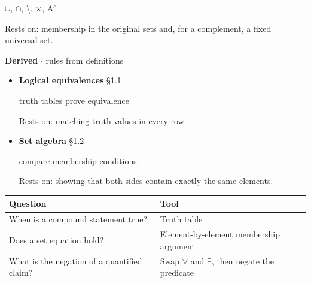 \documentclass[11pt]{article}
\begin{document}
\begin{keepsection}
\begin{itemize}
\ensuremath{\cup}, \ensuremath{\cap}, \textbackslash{}, \ensuremath{\times}, A\ensuremath{^{c}}

Rests on: membership in the original sets and, for a complement, a fixed universal set.
\end{itemize}

\textbf{Derived} \ensuremath{\cdot} rules from definitions

\begin{itemize}
\item {}
\textbf{Logical equivalences} \hfill{\small\color{FAUblue}§1.1}

truth tables prove equivalence

Rests on: matching truth values in every row.
\item {}
\textbf{Set algebra} \hfill{\small\color{FAUblue}§1.2}

compare membership conditions

Rests on: showing that both sides contain exactly the same elements.
\end{itemize}

\begin{center}\small\begin{tabularx}{\linewidth}{>{\raggedright\arraybackslash}X>{\raggedright\arraybackslash}X}\toprule
\textbf{Question} & \textbf{Tool} \\ \midrule
When is a compound statement true? & Truth table \\
Does a set equation hold? & Element-by-element membership argument \\
What is the negation of a quantified claim? & Swap \ensuremath{\forall} and \ensuremath{\exists}, then negate the predicate \\
\bottomrule\end{tabularx}\end{center}
\end{keepsection}
\end{document}
